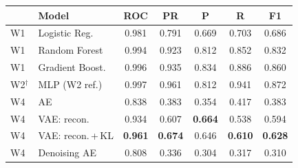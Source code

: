 \begin{tabular}{llccccc}
\hline
& \textbf{Model} & \textbf{ROC} & \textbf{PR} & \textbf{P} & \textbf{R} & \textbf{F1} \\ \hline
W1 & Logistic Reg. & 0.981 & 0.791 & 0.669 & 0.703 & 0.686 \\
W1 & Random Forest & 0.994 & 0.923 & 0.812 & 0.852 & 0.832 \\
W1 & Gradient Boost. & 0.996 & 0.935 & 0.834 & 0.886 & 0.860 \\
W2$^\dagger$ & MLP (W2 ref.) & 0.997 & 0.961 & 0.812 & 0.941 & 0.872 \\
\hline
W4 & AE & 0.838 & 0.383 & 0.354 & 0.417 & 0.383 \\
W4 & VAE: recon. & 0.934 & 0.607 & \textbf{0.664} & 0.538 & 0.594 \\
W4 & VAE: recon.\,+\,KL & \textbf{0.961} & \textbf{0.674} & 0.646 & \textbf{0.610} & \textbf{0.628} \\
W4 & Denoising AE & 0.808 & 0.336 & 0.304 & 0.317 & 0.310 \\
\hline
\end{tabular}
